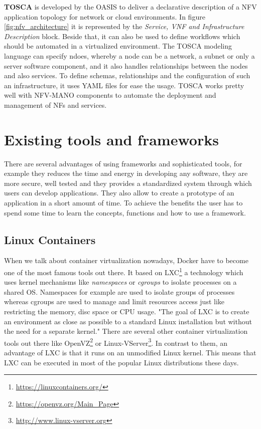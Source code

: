 \textbf{\ac{TOSCA}} is developed by the \ac{OASIS} to deliver a declarative description of a \ac{NFV} application topology for network or cloud environments.\cite[cf.]{Tosca:NFV}
In figure \ref{fig:nfv_architecture} it is represented by the \textit{Service, VNF and Infrastructure Description} block.
Beside that, it can also be used to define workflows which should be automated in a virtualized environment.\cite[cf.]{Tosca:NFV}
The \ac{TOSCA} modeling language can specify ndoes, whereby a node can be a network, a subnet or only a server software component, and it also handles relationships between the nodes and also services.\cite[cf.]{Tosca:NFV}
To define schemas, relationships and the configuration of such an infrastructure, it uses \ac{YAML} files for ease the usage.\cite[cf.]{Tosca:NFV}
\ac{TOSCA} works pretty well with \ac{NFV-MANO} components to automate the deployment and management of \acp{NF} and services.


\section{Existing tools and frameworks}

There are several advantages of using frameworks and sophisticated tools, for example they reduces the time and energy in developing any software, they are more secure, well tested and they provides a standardized system through which users can develop applications.
They also allow to create a prototype of an application in a short amount of time.
To achieve the benefits the user has to spend some time to learn the concepts, functions and how to use a framework.

\subsection{Linux Containers}
When we talk about container virtualization nowadays, Docker have to become one of the most famous tools out there.
It based on \ac{LXC}\footnote{\url{https://linuxcontainers.org/}} a technology which uses kernel mechanisms like \textit{namespaces} or \textit{cgroups} to isolate processes on a shared \ac{OS}.\cite[cf.][p. 381]{Pahl:2015}
Namespaces for example are used to isolate groups of processes whereas cgroups are used to manage and limit resources access just like restricting the memory, disc space or \ac{CPU} usage.\cite[cf.][p. 381]{Pahl:2015}
"The goal of \ac{LXC} is to create an environment as close as possible to a standard Linux installation but without the need for a separate kernel."\cite[p. 72]{Tosatto:2015}
There are several other container virtualization tools out there like OpenVZ\footnote{\url{https://openvz.org/Main_Page}} or Linux-VServer\footnote{\url{http://www.linux-vserver.org}}.
In contrast to them, an advantage of \ac{LXC} is that it runs on an unmodified Linux kernel.
This means that \ac{LXC} can be executed in most of the popular Linux distributions these days.

